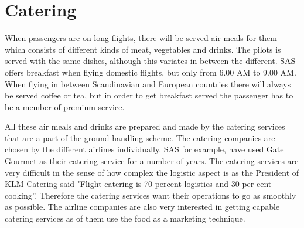 \section{Catering} 
When passengers are on long flights, there will be served air meals for them which consists of different kinds of meat, vegetables and drinks. The pilots is served with the same dishes, although this variates in between the different\cite{cate_pilotfood1}\cite{cate_pilotfood2}. SAS offers breakfast when flying domestic flights, but only from 6.00 AM to 9.00 AM\cite{cate_SASIndri}. When flying in between Scandinavian and European countries there will always be served coffee or tea, but in order to get breakfast served the passenger has to be a member of premium service\cite{cate_SASscanda}.

All these air meals and drinks are prepared and made by the catering services that are a part of the ground handling scheme. The catering companies are chosen by the different airlines individually. SAS for example, have used Gate Gourmet\cite{cate_SASGourmet} as their catering service for a number of years. The catering services are very difficult in the sense of how complex the logistic aspect is as the President of KLM Catering said "Flight catering is 70 
percent logistics and 30 per cent cooking”\cite{cate_BookSection}. Therefore the catering services want their operations to go as smoothly as possible. The airline companies are also very interested in getting capable catering services as of them use the food as a marketing technique\cite{cate_BookSection}. 
